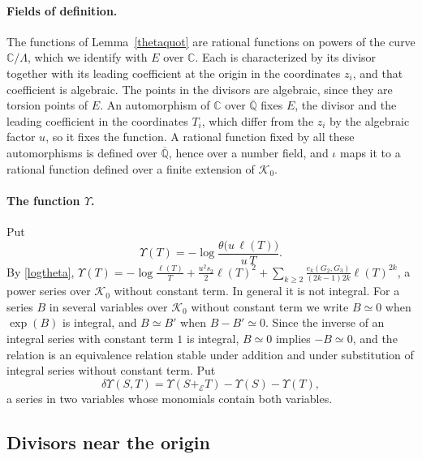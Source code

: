 \paragraph{Fields of definition.} The functions of Lemma~\ref{thetaquot} are rational functions on powers of the curve $\mathbb C/\Lambda$, which we identify with $E$ over $\mathbb C$. Each is characterized by its divisor together with its leading coefficient at the origin in the coordinates $z_i$, and that coefficient is algebraic. The points in the divisors are algebraic, since they are torsion points of $E$. An automorphism of $\mathbb C$ over $\overline{\mathbb Q}$ fixes $E$, the divisor and the leading coefficient in the coordinates $T_i$, which differ from the $z_i$ by the algebraic factor $u$, so it fixes the function. A rational function fixed by all these automorphisms is defined over $\overline{\mathbb Q}$, hence over a number field, and $\iota$ maps it to a rational function defined over a finite extension of $\mathcal K_0$.

\paragraph{The function $\Upsilon$.} Put
\begin{equation}\label{Upsdef}
\Upsilon(T)=-\log\frac{\theta\big(u\,\ell(T)\big)}{u\,T}.
\end{equation}
By \eqref{logtheta}, $\Upsilon(T)=-\log\frac{\ell(T)}T+\frac{u^2s_2}2\ell(T)^2+\sum_{k\ge2}\frac{e_k(G_2,G_3)}{(2k-1)2k}\ell(T)^{2k}$, a power series over $\mathcal K_0$ without constant term. In general it is not integral. For a series $B$ in several variables over $\mathcal K_0$ without constant term we write $B\simeq0$ when $\exp(B)$ is integral, and $B\simeq B'$ when $B-B'\simeq0$. Since the inverse of an integral series with constant term $1$ is integral, $B\simeq0$ implies $-B\simeq0$, and the relation is an equivalence relation stable under addition and under substitution of integral series without constant term. Put
\[
\delta\Upsilon(S,T)=\Upsilon(S+_{\mathcal E}T)-\Upsilon(S)-\Upsilon(T),
\]
a series in two variables whose monomials contain both variables.

\subsection{Divisors near the origin}\label{sec:divisors}


